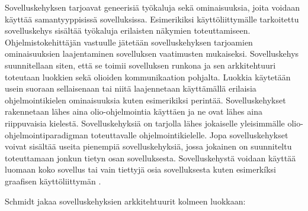 \documentclass[utf8]{gradu3}
\begin{document}
Sovelluskehyksen tarjoavat geneerisiä työkaluja sekä ominaisuuksia, joita voidaan käyttää samantyyppisissä sovelluksissa. Esimerikiksi käyttöliittymälle tarkoitettu sovelluskehys sisältää työkaluja erilaisten näkymien toteuttamiseen. Ohjelmistokehittäjän vastuulle jätetään sovelluskehyksen tarjoamien ominaisuuksien laajentaminen sovelluksen vaatimusten mukaiseksi. Sovelluskehys suunnitellaan siten, että se toimii sovelluksen runkona ja sen arkkitehtuuri toteutaan luokkien sekä olioiden kommunikaation pohjalta. Luokkia käytetään usein suoraan sellaisenaan tai niitä laajennetaan käyttämällä erilaisia ohjelmointikielen ominaisuuksia kuten esimerikiksi perintää. Sovelluskehykset rakennetaan lähes aina olio-ohjelmointia käyttäen ja ne ovat lähes aina riippuvaisia kielestä. Sovelluskehyksiä on tarjolla lähes jokaiselle yleisimmälle olio-ohjelmointiparadigman toteuttavalle ohjelmointikielelle. Jopa sovelluskehykset voivat sisältää useita pienempiä sovelluskehyksiä, jossa jokainen on suunniteltu toteuttamaan jonkun tietyn osan sovelluksesta. Sovelluskehystä voidaan käyttää luomaan koko sovellus tai vain tiettyjä osia sovelluksesta kuten esimerkíksi graafisen käyttöliittymän  \parencite[s. 431]{Sommerville}.

Schmidt \parencite{frameworks} jakaa sovelluskehyksien arkkitehtuurit kolmeen luokkaan:
\end{document}
